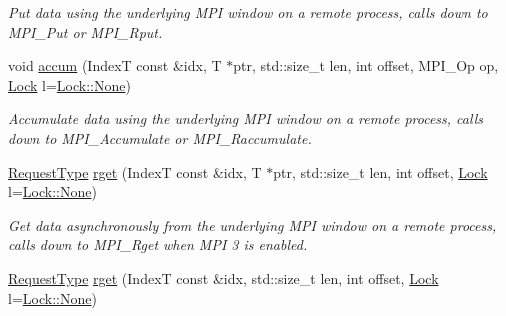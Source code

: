 \begin{DoxyCompactItemize}
\begin{DoxyCompactList}\small\item\em Put data using the underlying M\+PI window on a remote process, calls down to {\ttfamily M\+P\+I\+\_\+\+Put} or {\ttfamily M\+P\+I\+\_\+\+Rput}. \end{DoxyCompactList}\item 
void \hyperlink{structvt_1_1rdma_1_1_handle_3_01_t_00_01_e_00_01_index_t_00_01typename_01std_1_1enable__if__t_3_f66c3940d9f3649c3a5c3e77d63c658a_a8182aefb99d33b103c671addb6bb28c2}{accum} (IndexT const \&idx, T $\ast$ptr, std\+::size\+\_\+t len, int offset, M\+P\+I\+\_\+\+Op op, \hyperlink{namespacevt_1_1rdma_ac5c20b41a653e520b6305d4d454ecb70}{Lock} l=\hyperlink{namespacevt_1_1rdma_ac5c20b41a653e520b6305d4d454ecb70a6adf97f83acf6453d4a6a4b1070f3754}{Lock\+::\+None})
\begin{DoxyCompactList}\small\item\em Accumulate data using the underlying M\+PI window on a remote process, calls down to {\ttfamily M\+P\+I\+\_\+\+Accumulate} or {\ttfamily M\+P\+I\+\_\+\+Raccumulate}. \end{DoxyCompactList}\item 
\hyperlink{structvt_1_1rdma_1_1_base_typed_handle_a449c2c1948f5793c3fdfb1aba5801ed7}{Request\+Type} \hyperlink{structvt_1_1rdma_1_1_handle_3_01_t_00_01_e_00_01_index_t_00_01typename_01std_1_1enable__if__t_3_f66c3940d9f3649c3a5c3e77d63c658a_ae48628cffbfa47fe7cd171426e1a76b6}{rget} (IndexT const \&idx, T $\ast$ptr, std\+::size\+\_\+t len, int offset, \hyperlink{namespacevt_1_1rdma_ac5c20b41a653e520b6305d4d454ecb70}{Lock} l=\hyperlink{namespacevt_1_1rdma_ac5c20b41a653e520b6305d4d454ecb70a6adf97f83acf6453d4a6a4b1070f3754}{Lock\+::\+None})
\begin{DoxyCompactList}\small\item\em Get data asynchronously from the underlying M\+PI window on a remote process, calls down to {\ttfamily M\+P\+I\+\_\+\+Rget} when M\+PI 3 is enabled. \end{DoxyCompactList}\item 
\hyperlink{structvt_1_1rdma_1_1_base_typed_handle_a449c2c1948f5793c3fdfb1aba5801ed7}{Request\+Type} \hyperlink{structvt_1_1rdma_1_1_handle_3_01_t_00_01_e_00_01_index_t_00_01typename_01std_1_1enable__if__t_3_f66c3940d9f3649c3a5c3e77d63c658a_aa944bb8230caf7e0852c21099f5d8cab}{rget} (IndexT const \&idx, std\+::size\+\_\+t len, int offset, \hyperlink{namespacevt_1_1rdma_ac5c20b41a653e520b6305d4d454ecb70}{Lock} l=\hyperlink{namespacevt_1_1rdma_ac5c20b41a653e520b6305d4d454ecb70a6adf97f83acf6453d4a6a4b1070f3754}{Lock\+::\+None})

\end{DoxyCompactItemize}
